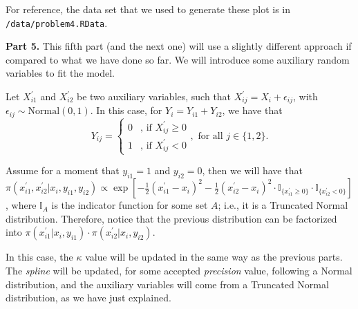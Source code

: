 \documentclass[12pt]{article}\usepackage[]{graphicx}\usepackage[]{color}
\begin{document}
For reference, the data set that we used to generate these plot is in \texttt{/data/problem4.RData}.


\newpage

\textbf{Part 5.}
This fifth part (and the next one) will use a slightly different approach if compared to what we have done so far. We will introduce some auxiliary random variables to fit the model. 

Let $X_{i1}^{\prime}$ and $X_{i2}^{\prime}$ be two auxiliary variables, such that $X_{ij}^{\prime} = X_i + \epsilon_{ij}$, with $\epsilon_{ij} \sim \text{Normal}(0, 1)$. In this case, for $Y_i = Y_{i1} + Y_{i2}$, we have that
\[ Y_{ij} = 
    \begin{cases}
      0 & \text{, if } X_{ij}^{\prime} \geq 0 \\
      1 & \text{, if } X_{ij}^{\prime}    < 0
    \end{cases}, \text{ for all } j \in \{1, 2\}.
\]

Assume for a moment that $y_{i1} = 1$ and $y_{i2} = 0$, then we will have that $\pi(x_{i1}^{\prime}, x_{i2}^{\prime} | x_i, y_{i1}, y_{i2}) \propto \exp\left[-\frac{1}{2}(x_{i1}^{\prime} - x_i)^2 - \frac{1}{2}(x_{i2}^{\prime} - x_i)^2 \cdot \mathbb{I}_{\{x_{i1}^{\prime} \geq 0\}} \cdot \mathbb{I}_{\{x_{i2}^{\prime} < 0\}}\right]$, where $\mathbb{I}_A$ is the indicator function for some set $A$; i.e., it is a Truncated Normal distribution. Therefore, notice that the previous distribution can be factorized into $\pi(x_{i1}^{\prime}|x_i, y_{i1}) \cdot \pi(x_{i2}^{\prime}|x_i, y_{i2})$.

In this case, the $\kappa$ value will be updated in the same way as the previous parts. The \textit{spline} will be updated, for some accepted \textit{precision} value, following a Normal distribution, and the auxiliary variables will come from a Truncated Normal distribution, as we have just explained.
\end{document}
